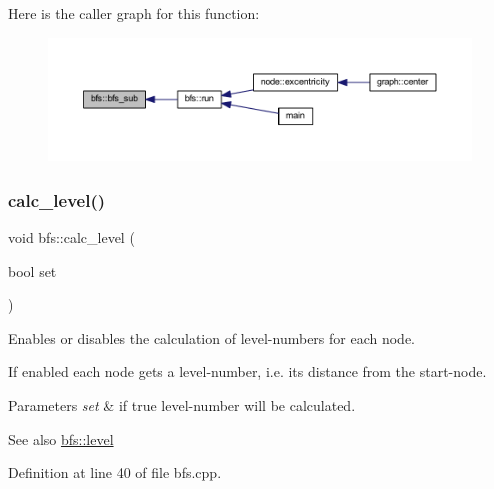 Here is the caller graph for this function\+:\nopagebreak
\begin{figure}[H]
\begin{center}
\leavevmode
\includegraphics[width=350pt]{classbfs_a567815d3b63e802420f4b536749a1ad2_icgraph}
\end{center}
\end{figure}
\mbox{\label{classbfs_a491515da4eb8efca0be4fef0df350a8e}} 
\subsubsection{\texorpdfstring{calc\+\_\+level()}{calc\_level()}\hspace{0.1cm}{\footnotesize\ttfamily [1/2]}}
{\footnotesize\ttfamily void bfs\+::calc\+\_\+level (\begin{DoxyParamCaption}\item[{bool}]{set }\end{DoxyParamCaption})}



Enables or disables the calculation of level-\/numbers for each node. 

If enabled each node gets a level-\/number, i.\+e. its distance from the start-\/node.


\begin{DoxyParams}{Parameters}
{\em set} & if true level-\/number will be calculated. \\
\hline
\end{DoxyParams}
\begin{DoxySeeAlso}{See also}
\mbox{\hyperlink{classbfs_ac0158a0453fb17a89be4049d21db56b1}{bfs\+::level}} 
\end{DoxySeeAlso}


Definition at line 40 of file bfs.\+cpp.


